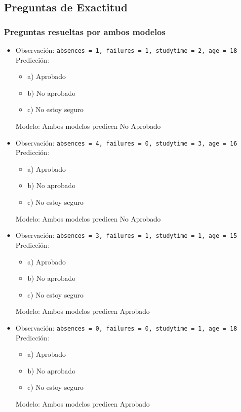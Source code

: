 \subsection{Preguntas de Exactitud}

\subsubsection{Preguntas resueltas por ambos modelos}
\begin{itemize}
    \item Observación: \texttt{absences = 1, failures = 1, studytime = 2, age = 18}\\
    Predicción:
    \begin{itemize}
        \item a) Aprobado
        \item b) No aprobado
        \item c) No estoy seguro
    \end{itemize}
    Modelo: Ambos modelos predicen No Aprobado

    \item Observación: \texttt{absences = 4, failures = 0, studytime = 3, age = 16}\\
    Predicción:
    \begin{itemize}
        \item a) Aprobado
        \item b) No aprobado
        \item c) No estoy seguro
    \end{itemize}
    Modelo: Ambos modelos predicen No Aprobado

    \item Observación: \texttt{absences = 3, failures = 1, studytime = 1, age = 15}\\
    Predicción:
    \begin{itemize}
        \item a) Aprobado
        \item b) No aprobado
        \item c) No estoy seguro
    \end{itemize}
    Modelo: Ambos modelos predicen Aprobado

    \item Observación: \texttt{absences = 0, failures = 0, studytime = 1, age = 18}\\
    Predicción:
    \begin{itemize}
        \item a) Aprobado
        \item b) No aprobado
        \item c) No estoy seguro
    \end{itemize}
    Modelo: Ambos modelos predicen Aprobado


\end{itemize}
